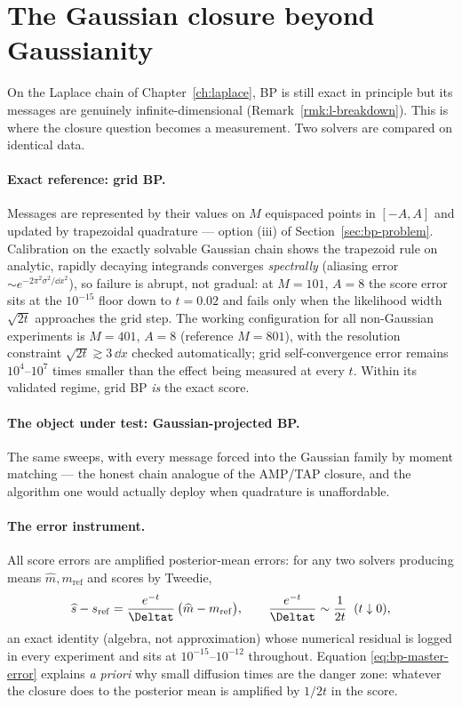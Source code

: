 \section{The Gaussian closure beyond Gaussianity}\label{sec:bp-nongaussian}

On the Laplace chain of Chapter~\ref{ch:laplace}, BP is still exact in
principle but its messages are genuinely infinite-dimensional
(Remark~\ref{rmk:l-breakdown}). This is where the closure question becomes
a measurement. Two solvers are compared on identical data.

\paragraph{Exact reference: grid BP.} Messages are represented by their
values on $M$ equispaced points in $[-A, A]$ and updated by trapezoidal
quadrature --- option (iii) of Section~\ref{sec:bp-problem}. Calibration
on the exactly solvable Gaussian chain shows the trapezoid rule on
analytic, rapidly decaying integrands converges \emph{spectrally}
(aliasing error $\sim e^{-2\pi^2 \sigma^2/\dd x^2}$), so failure is
abrupt, not gradual: at $M = 101$, $A = 8$ the score error sits at the
$10^{-15}$ floor down to $t = 0.02$ and fails only when the likelihood
width $\sqrt{2t}$ approaches the grid step. The working configuration for
all non-Gaussian experiments is $M = 401$, $A = 8$ (reference $M = 801$),
with the resolution constraint $\sqrt{2t} \gtrsim 3\,\dd x$ checked
automatically; grid self-convergence error remains $10^4$--$10^7$ times
smaller than the effect being measured at every $t$. Within its validated
regime, grid BP \emph{is} the exact score.

\paragraph{The object under test: Gaussian-projected BP.} The same sweeps,
with every message forced into the Gaussian family by moment matching ---
the honest chain analogue of the AMP/TAP closure, and the algorithm one
would actually deploy when quadrature is unaffordable.

\paragraph{The error instrument.} All score errors are amplified
posterior-mean errors: for any two solvers producing means
$\widehat m, m_{\mathrm{ref}}$ and scores by Tweedie,
\begin{equation}
  \widehat s - s_{\mathrm{ref}}
  = \frac{e^{-t}}{\Deltat}\,
    \big( \widehat m - m_{\mathrm{ref}} \big),
  \qquad
  \frac{e^{-t}}{\Deltat} \sim \frac{1}{2t} \;\; (t \downarrow 0),
  \label{eq:bp-master-error}
\end{equation}
an exact identity (algebra, not approximation) whose numerical residual is
logged in every experiment and sits at $10^{-15}$--$10^{-12}$ throughout.
Equation \eqref{eq:bp-master-error} explains \emph{a priori} why small
diffusion times are the danger zone: whatever the closure does to the
posterior mean is amplified by $1/2t$ in the score.

